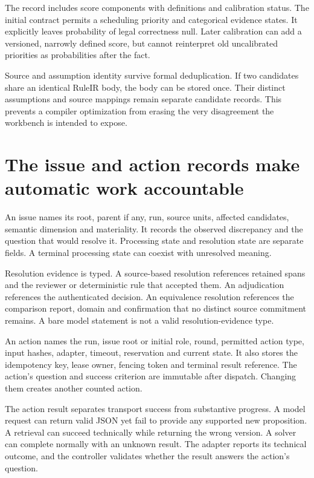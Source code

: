 \documentclass[12pt,a4paper,oneside,openany]{book}
\begin{document}
The record includes score components with definitions and calibration status.
The initial contract permits a scheduling priority and categorical evidence
states. It explicitly leaves probability of legal correctness null. Later
calibration can add a versioned, narrowly defined score, but cannot reinterpret
old uncalibrated priorities as probabilities after the fact.

Source and assumption identity survive formal deduplication. If two candidates
share an identical RuleIR body, the body can be stored once. Their distinct
assumptions and source mappings remain separate candidate records. This prevents
a compiler optimization from erasing the very disagreement the workbench is
intended to expose.

\section{The issue and action records make automatic work accountable}
\label{merge:M08:04}


An issue names its root, parent if any, run, source units, affected candidates,
semantic dimension and materiality. It records the observed discrepancy and the
question that would resolve it. Processing state and resolution state are separate
fields. A terminal processing state can coexist with unresolved meaning.

Resolution evidence is typed. A source-based resolution references retained spans
and the reviewer or deterministic rule that accepted them. An adjudication
references the authenticated decision. An equivalence resolution references the
comparison report, domain and confirmation that no distinct source commitment
remains. A bare model statement is not a valid resolution-evidence type.

An action names the run, issue root or initial role, round, permitted action type,
input hashes, adapter, timeout, reservation and current state. It also stores the
idempotency key, lease owner, fencing token and terminal result reference. The
action's question and success criterion are immutable after dispatch. Changing
them creates another counted action.

The action result separates transport success from substantive progress. A model
request can return valid JSON yet fail to provide any supported new proposition.
A retrieval can succeed technically while returning the wrong version. A solver
can complete normally with an unknown result. The adapter reports its technical
outcome, and the controller validates whether the result answers the action's
question.
\end{document}
